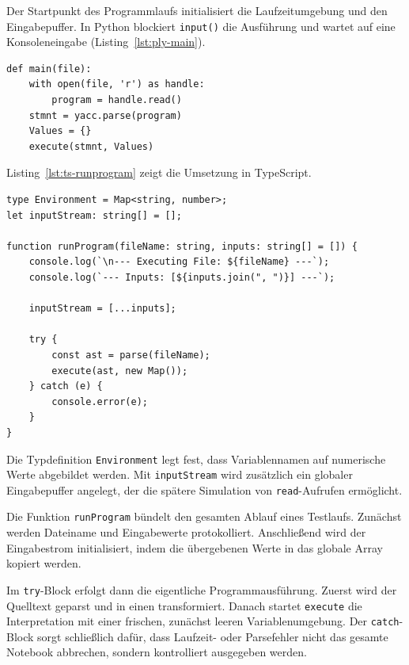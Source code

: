Der Startpunkt des Programmlaufs initialisiert die Laufzeitumgebung und den Eingabepuffer. In Python blockiert \texttt{input()} die Ausführung und wartet auf eine Konsoleneingabe (Listing~\ref{lst:ply-main}).

\begin{listing}[htbp]
\caption{Programmausführung in Python}
\label{lst:ply-main}
\begin{verbatim}
def main(file):
    with open(file, 'r') as handle:
        program = handle.read() 
    stmnt = yacc.parse(program)
    Values = {}
    execute(stmnt, Values)
\end{verbatim}
\end{listing}

Listing~\ref{lst:ts-runprogram} zeigt die Umsetzung in TypeScript.

\begin{listing}[htbp]
\caption{Programmausführung und -Simulation in TypeScript}
\label{lst:ts-runprogram}
\begin{verbatim}
type Environment = Map<string, number>;
let inputStream: string[] = [];

function runProgram(fileName: string, inputs: string[] = []) {
    console.log(`\n--- Executing File: ${fileName} ---`);
    console.log(`--- Inputs: [${inputs.join(", ")}] ---`);

    inputStream = [...inputs];

    try {
        const ast = parse(fileName);
        execute(ast, new Map());
    } catch (e) {
        console.error(e);
    }
}
\end{verbatim}
\end{listing}

Die Typdefinition \texttt{Environment} legt fest, dass Variablennamen auf numerische Werte abgebildet werden. Mit \texttt{inputStream} wird zusätzlich ein globaler Eingabepuffer angelegt, der die spätere Simulation von \texttt{read}-Aufrufen ermöglicht.

Die Funktion \texttt{runProgram} bündelt den gesamten Ablauf eines Testlaufs. Zunächst werden Dateiname und Eingabewerte protokolliert. Anschließend wird der Eingabestrom initialisiert, indem die übergebenen Werte in das globale Array kopiert werden.

Im \texttt{try}-Block erfolgt dann die eigentliche Programmausführung. Zuerst wird der Quelltext geparst und in einen  transformiert. Danach startet \texttt{execute} die Interpretation mit einer frischen, zunächst leeren Variablenumgebung. Der \texttt{catch}-Block sorgt schließlich dafür, dass Laufzeit- oder Parsefehler nicht das gesamte Notebook abbrechen, sondern kontrolliert ausgegeben werden.

